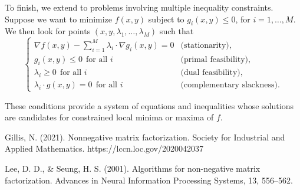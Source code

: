 \documentclass{amsart}
\begin{document}
To finish, we extend to problems involving multiple inequality constraints. Suppose we want to minimize $f(x,y)$ subject to $g_i(x,y)\leq 0$, for $i=1,\ldots, M$. We then look for points $(x,y,\lambda_1,\ldots,\lambda_M)$ such that
\begin{equation}
    \label{KKT_conditions}
    \begin{cases}
    \nabla f(x,y) -\sum_{i=1}^M \lambda_i\cdot \nabla g_i(x,y)= 0& \text{(stationarity),}\\
    g_i(x,y)\leq 0\ \ \text{for all $i$} & \text{(primal feasibility),}\\
    \lambda_i\geq 0\ \ \text{for all $i$} & \text{(dual feasibility),}\\
    \lambda_i\cdot g(x,y)= 0\ \ \text{for all $i$} & \text{(complementary slackness).}
    \end{cases}
\end{equation}

These conditions provide a system of equations and inequalities whose solutions are candidates for constrained local minima or maxima of $f$.


\begin{thebibliography}{9}
    Gillis, N. (2021). Nonnegative matrix factorization. Society for Industrial and Applied Mathematics. https://lccn.loc.gov/2020042037

    Lee, D. D., \& Seung, H. S. (2001). Algorithms for non-negative matrix factorization. Advances in Neural Information Processing Systems, 13, 556–562.
\end{thebibliography}
\end{document}
